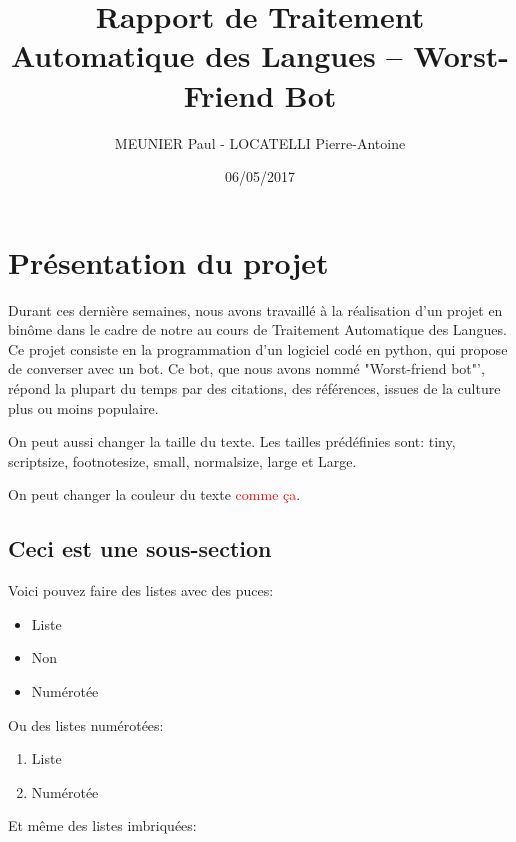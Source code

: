 \documentclass[paper=a4, fontsize=11pt]{article}
\begin{document}
\title{Rapport de Traitement Automatique des Langues -- Worst-Friend Bot}
\author{MEUNIER Paul - LOCATELLI Pierre-Antoine}
\date{06/05/2017}
\maketitle

\section{Présentation du projet}
Durant ces dernière semaines, nous avons travaillé à la réalisation d'un projet en binôme dans le cadre de notre au cours de Traitement Automatique des Langues. Ce projet consiste en la programmation d'un logiciel codé en python, qui propose de converser avec un bot. Ce bot, que nous avons nommé "Worst-friend bot"', répond la plupart du temps par des citations, des références, issues de la culture plus ou moins populaire.


On peut aussi {\small changer} {\large la taille} {\tiny du texte}.  Les tailles prédéfinies sont:
{\tiny tiny}, {\scriptsize scriptsize}, {\footnotesize footnotesize}, {\small small}, {\normalsize
  normalsize}, {\large large} et {\Large Large}.

On peut changer la couleur du texte \textcolor{red}{comme ça}.

\subsection{Ceci est une sous-section}
Voici pouvez faire des listes avec des puces:

\begin{itemize}
\item Liste
\item Non
\item Numérotée
\end{itemize}

\vspace{0.5cm} %

Ou des listes numérotées:
\begin{enumerate}
\item Liste
\item Numérotée
\end{enumerate}

\vspace{0.5cm}
Et même des listes imbriquées:
\end{document}
